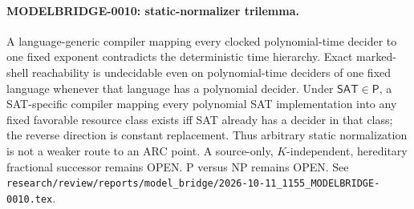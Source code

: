 \paragraph{MODELBRIDGE-0010: static-normalizer trilemma.}
A language-generic compiler mapping every clocked polynomial-time decider to
one fixed exponent contradicts the deterministic time hierarchy.  Exact
marked-shell reachability is undecidable even on polynomial-time deciders of
one fixed language whenever that language has a polynomial decider.  Under
$\mathsf{SAT}\in\mathsf P$, a SAT-specific compiler mapping every polynomial
SAT implementation into any fixed favorable resource class exists iff SAT
already has a decider in that class; the reverse direction is constant
replacement.  Thus arbitrary static normalization is not a weaker route to an
ARC point.  A source-only, $K$-independent, hereditary fractional successor
remains OPEN.  P versus NP remains OPEN.  See
\texttt{research/review/reports/model\_bridge/2026-10-11\_1155\_MODELBRIDGE-0010.tex}.
